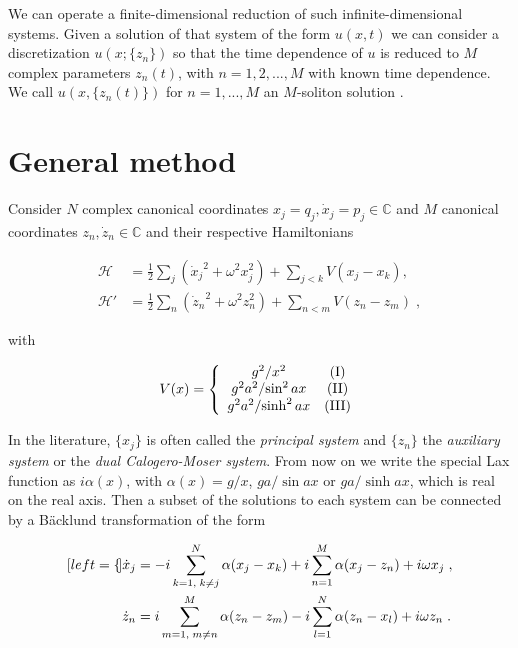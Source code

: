 We can operate a finite-dimensional reduction of such infinite-dimensional systems. Given a solution of that system of the form $u(x,t)$ we can consider a discretization $u(x; \{z_n\})$ so that the time dependence of $u$ is reduced to $M$ complex parameters $z_n (t)$, with $n = 1, 2,..., M$ with known time dependence. We call $u(x, \{z_n(t)\})$ for $n = 1, ..., M$ an $M$-soliton solution \cite{abanov2011}. 

\section{General method}\label{sec:general}
Consider $N$ complex canonical coordinates $x_j = q_j, \dot x_j = p_j \in \mathbb{C}$ and $M$ canonical coordinates $z_n, \dot z_n \in \mathbb{C}$ and their respective Hamiltonians

\begin{subequations}
\begin{align}
    \mathcal{H} &= \frac{1}{2}\sum_j ({\dot x_j}^2 + \omega^2 x_j^2) + \sum_{j < k} V(x_j - x_k), \\
    \mathcal{H'} &= \frac{1}{2}\sum_n ({\dot z_n}^2 + \omega^2 z_n^2) + \sum_{n < m} V(z_n - z_m)\;,
\end{align}
\end{subequations}

with 

\[V(x) = \left \{ \begin{array}{cc}
{g^2}/{x^2}  & \textnormal{(I)}\\
{g^2a^2}/{\sin^2{ax}}  & \textnormal{(II)}\\
{g^2a^2}/{\sinh^2{ax}} & \textnormal{(III)}
\end{array}
\right.\]

In the literature, $\{x_j\}$ is often called the \textit{principal system} and $\{z_n\}$ the \textit{auxiliary system} or the \textit{dual Calogero-Moser system}. From now on we write the special Lax function as $i\alpha(x)$, with $\alpha(x) = g/x$, $ga/\sin{ax}$ or $ga/\sinh{ax}$, which is real on the real axis. Then a subset of the solutions to each system can be connected by a Bäcklund transformation of the form

\begin{subequations}
\begin{align}[left=\empheqlbrace]
\dot x_j &= - i\sum_{k=1,\;k \neq j}^N \alpha(x_j - x_k) + i\sum_{n = 1}^M \alpha(x_j - z_n) + i\omega x_j \label{soliton1}\;,\\
\dot z_n &= i\sum_{m=1,\;m \neq n}^M \alpha(z_n - z_m) - i\sum_{l = 1}^N \alpha(z_n - x_l) + i\omega z_n\label{soliton1b}\;.
\end{align}
\end{subequations}

